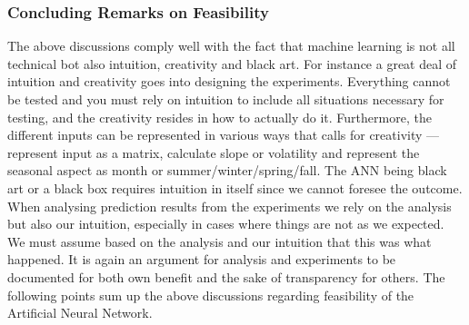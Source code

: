 \subsubsection{Concluding Remarks on Feasibility}
The above discussions comply well with the fact that machine learning is not all technical bot also intuition, creativity and black art\cite{18}. For instance a great deal of intuition and creativity goes into designing the experiments. Everything cannot be tested and you must rely on intuition to include all situations necessary for testing, and the creativity resides in how to actually do it. Furthermore, the different inputs can be represented in various ways that calls for creativity --- represent input as a matrix, calculate slope or volatility and represent the seasonal aspect as month or summer/winter/spring/fall. The ANN being black art or a black box requires intuition in itself since we cannot foresee the outcome. When analysing prediction results from the experiments we rely on the analysis but also our intuition, especially in cases where things are not as we expected. We must assume based on the analysis and our intuition that this was what happened. It is again an argument for analysis and experiments to be documented for both own benefit and the sake of transparency for others. The following points sum up the above discussions regarding feasibility of the Artificial Neural Network.

